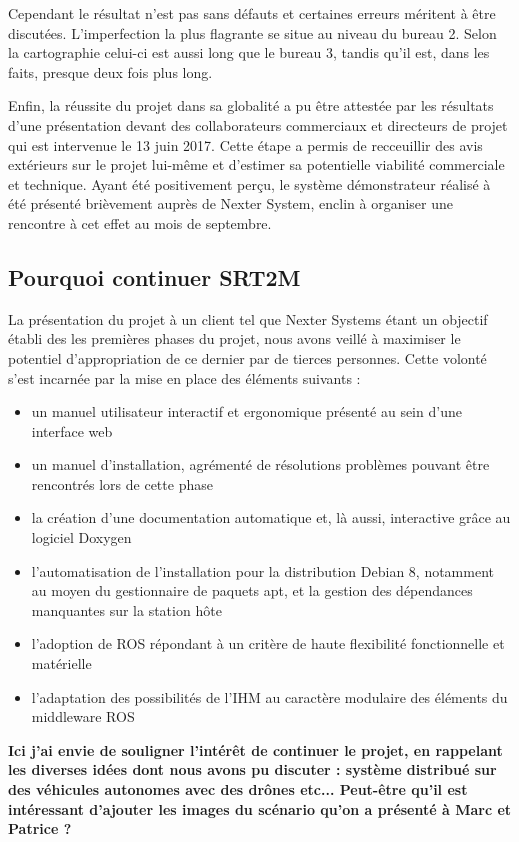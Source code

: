   Cependant le résultat n'est pas sans défauts et certaines erreurs méritent à être discutées. 
  L'imperfection la plus flagrante se situe au niveau du bureau 2. 
  Selon la cartographie celui-ci est aussi long que le bureau 3, tandis qu'il est, dans les faits, presque deux fois plus long. 
  
  Enfin, la réussite du projet dans sa globalité a pu être attestée par les résultats d'une présentation devant des collaborateurs commerciaux et directeurs de projet qui est intervenue le 13 juin 2017.
  Cette étape a permis de recceuillir des avis extérieurs sur le projet lui-même et d'estimer sa potentielle viabilité commerciale et technique. 
  Ayant été positivement perçu, le système démonstrateur réalisé à été présenté brièvement auprès de Nexter System, enclin à organiser une rencontre à cet effet au mois de septembre. 
  
  \subsection{Pourquoi continuer SRT2M}
  
  La présentation du projet à un client tel que Nexter Systems étant un objectif établi des les premières phases du projet, nous avons veillé à maximiser le potentiel d'appropriation de ce dernier par de tierces personnes.
  Cette volonté s'est incarnée par la mise en place des éléments suivants : 
  
  \begin{itemize}
   \item un manuel utilisateur interactif et ergonomique présenté au sein d'une interface web
   \item un manuel d'installation, agrémenté de résolutions problèmes pouvant être rencontrés lors de cette phase
   \item la création d'une documentation automatique et, là aussi, interactive grâce au logiciel Doxygen
   \item l'automatisation de l'installation pour la distribution Debian 8, notamment au moyen du gestionnaire de paquets apt, et la gestion des dépendances manquantes sur la station hôte
   \item l'adoption de ROS répondant à un critère de haute flexibilité fonctionnelle et matérielle
   \item l'adaptation des possibilités de l'IHM au caractère modulaire des éléments du middleware ROS 
  \end{itemize}
  
  \textbf{Ici j'ai envie de souligner l'intérêt de continuer le projet, en rappelant les diverses idées dont nous avons pu discuter : système distribué sur des véhicules autonomes avec des drônes etc... 
  Peut-être qu'il est intéressant d'ajouter les images du scénario qu'on a présenté à Marc et Patrice ? }
  
